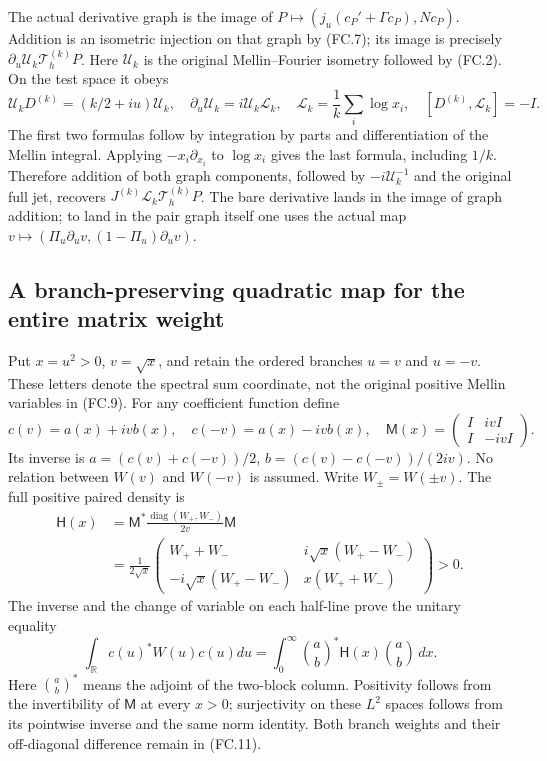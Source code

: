 The actual derivative graph is the image of
\(P\mapsto(j_u(c_P'+\Gamma c_P),Nc_P)\). Addition is an
isometric injection on that graph by (FC.7); its image is precisely
\(\partial_u\mathscr U_k\mathcal T_h^{(k)}P\). Here \(\mathscr U_k\)
is the original Mellin--Fourier isometry followed by (FC.2). On the
test space it obeys
\[
 \mathscr U_kD^{(k)}=(k/2+iu)\mathscr U_k,
 \quad \partial_u\mathscr U_k=i\mathscr U_k\mathscr L_k,
 \quad \mathscr L_k=\frac1k\sum_i\log x_i,
 \quad [D^{(k)},\mathscr L_k]=-I.
 \tag{FC.9}
\]
The first two formulas follow by integration by parts and
differentiation of the Mellin integral. Applying
\(-x_i\partial_{x_i}\) to \(\log x_i\) gives the last formula,
including \(1/k\). Therefore addition of both graph components,
followed by \(-i\mathscr U_k^{-1}\) and the original full jet,
recovers \(J^{(k)}\mathscr L_k\mathcal T_h^{(k)}P\). The bare
derivative lands in the image of graph addition; to land in the
pair graph itself one uses the actual map
\(v\mapsto(\Pi_u\partial_uv,(1-\Pi_u)\partial_uv)\).

\subsection{A branch-preserving quadratic map for the entire matrix weight}

Put \(x=u^2>0\), \(v=\sqrt x\), and retain the ordered branches
\(u=v\) and \(u=-v\). These letters denote the spectral sum
coordinate, not the original positive Mellin variables in (FC.9).
For any coefficient function define
\[
 c(v)=a(x)+ivb(x),\quad c(-v)=a(x)-ivb(x),\quad
 \mathsf M(x)=\begin{pmatrix}I&ivI\\I&-ivI\end{pmatrix}.
 \tag{FC.10}
\]
Its inverse is \(a=(c(v)+c(-v))/2\),
\(b=(c(v)-c(-v))/(2iv)\). No relation between \(W(v)\) and
\(W(-v)\) is assumed. Write \(W_\pm=W(\pm v)\). The full
positive paired density is
\[
 \begin{aligned}
 \mathsf H(x)&=\mathsf M^*
          \frac{\operatorname{diag}(W_+,W_-)}{2v}\mathsf M\\
 &=\frac1{2\sqrt x}
 \begin{pmatrix}
 W_++W_-&i\sqrt x(W_+-W_-)\\
 -i\sqrt x(W_+-W_-)&x(W_++W_-)
 \end{pmatrix}>0.
 \end{aligned}
 \tag{FC.11}
\]
The inverse and the change of variable on each half-line prove the
unitary equality
\[
 \int_{\mathbb R}c(u)^*W(u)c(u)du
   =\int_0^\infty \binom ab^*\mathsf H(x)\binom ab\,dx.
 \tag{FC.12}
\]
Here \(\binom ab^*\) means the adjoint of the two-block column.
Positivity follows from the invertibility of \(\mathsf M\) at
every \(x>0\); surjectivity on these \(L^2\) spaces follows
from its pointwise inverse and the same norm identity. Both branch
weights and their off-diagonal difference remain in (FC.11).

